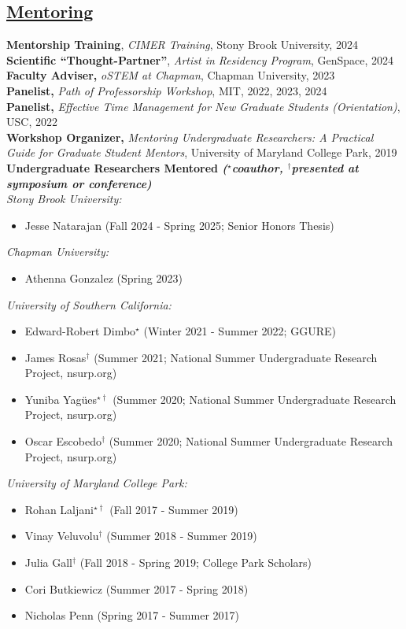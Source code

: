 \documentclass[]{res}
\begin{document}
\begin{resume}
\section{\underline{Mentoring}} \vspace{2mm}
{\bf Mentorship Training}, \emph{CIMER Training}, Stony Brook University, 2024\\
{\bf Scientific ``Thought-Partner''}, \emph{Artist in Residency Program}, GenSpace, 2024\\
{\bf Faculty Adviser,} \emph{oSTEM at Chapman}, Chapman University, 2023\\
{\bf Panelist,} \emph{Path of Professorship Workshop}, MIT, 2022, 2023, 2024\\
{\bf Panelist,} \emph{Effective Time Management for New Graduate Students (Orientation)}, USC, 2022\\
\newpage
{\bf Workshop Organizer,} \emph{Mentoring Undergraduate Researchers: A Practical Guide for Graduate Student Mentors}, University of Maryland College Park, 2019\\
{\bf Undergraduate Researchers Mentored \emph{\footnotesize{($^{\star}$coauthor, $^{\dagger}$presented at symposium or conference)}}} \\
\emph{Stony Brook University:}
\begin{itemize}[leftmargin=*]
\item[] Jesse Natarajan (Fall 2024 - Spring 2025; Senior Honors Thesis)
\end{itemize}
\emph{Chapman University:}
\begin{itemize}[leftmargin=*]
\item[] Athenna Gonzalez (Spring 2023)
\end{itemize}
\emph{University of Southern California:}
\begin{itemize}[leftmargin=*]
\item[] Edward-Robert Dimbo$^{\star}$ (Winter 2021 - Summer 2022; GGURE)
\item[] James Rosas$^{\dagger}$ (Summer 2021; National Summer Undergraduate Research Project, nsurp.org)
\item[] Yuniba Yag{\"u}es$^{\star\dagger}$ (Summer 2020; National Summer Undergraduate Research Project, nsurp.org)
\item[] Oscar Escobedo$^{\dagger}$ (Summer 2020; National Summer Undergraduate Research Project, nsurp.org)
\end{itemize}
\vspace{1mm}
\emph{University of Maryland College Park:}
\begin{itemize}[leftmargin=*]
\item[] Rohan Laljani$^{\star\dagger}$ (Fall 2017 - Summer 2019)
\item[] Vinay Veluvolu$^{\dagger}$ (Summer 2018 - Summer 2019)
\item[] Julia Gall$^{\dagger}$ (Fall 2018 - Spring 2019; College Park Scholars)
\item[] Cori Butkiewicz (Summer 2017 - Spring 2018)
\item[] Nicholas Penn (Spring 2017 - Summer 2017)
\end{itemize}



\end{resume}
\end{document}
